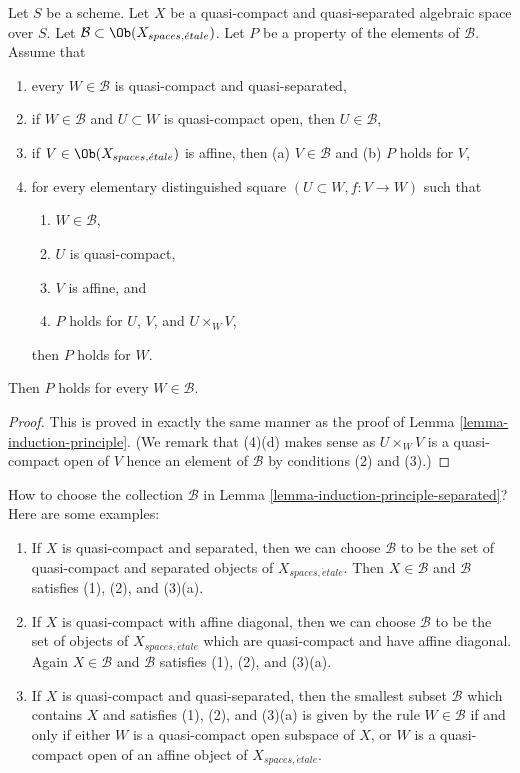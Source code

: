 \begin{lemma}
\label{lemma-induction-principle-separated}
Let $S$ be a scheme. Let $X$ be a quasi-compact and quasi-separated
algebraic space over $S$. Let
$\mathcal{B} \subset \Ob(X_{spaces, \acute{e}tale})$.
Let $P$ be a property of the elements of $\mathcal{B}$.
Assume that
\begin{enumerate}
\item every $W \in \mathcal{B}$ is quasi-compact and quasi-separated,
\item if $W \in \mathcal{B}$ and $U \subset W$ is quasi-compact open, then
$U \in \mathcal{B}$,
\item if $V \in \Ob(X_{spaces, \acute{e}tale})$ is affine, then
(a) $V \in \mathcal{B}$ and (b) $P$ holds for $V$,
\item for every elementary distinguished square $(U \subset W, f : V \to W)$
such that
\begin{enumerate}
\item $W \in \mathcal{B}$,
\item $U$ is quasi-compact,
\item $V$ is affine, and
\item $P$ holds for $U$, $V$, and $U \times_W V$,
\end{enumerate}
then $P$ holds for $W$.
\end{enumerate}
Then $P$ holds for every $W \in \mathcal{B}$.
\end{lemma}

\begin{proof}
This is proved in exactly the same manner as the proof of
Lemma \ref{lemma-induction-principle}.
(We remark that (4)(d) makes sense as $U \times_W V$ is a quasi-compact
open of $V$ hence an element of $\mathcal{B}$ by conditions
(2) and (3).)
\end{proof}

\begin{remark}
\label{remark-how-to}
How to choose the collection $\mathcal{B}$ in
Lemma \ref{lemma-induction-principle-separated}?
Here are some examples:
\begin{enumerate}
\item If $X$ is quasi-compact and separated, then we can choose
$\mathcal{B}$ to be the set of quasi-compact and separated objects
of $X_{spaces, \acute{e}tale}$. Then $X \in \mathcal{B}$ and $\mathcal{B}$
satisfies (1), (2), and (3)(a).
\item If $X$ is quasi-compact with affine diagonal, then we can choose
$\mathcal{B}$ to be the set of objects
of $X_{spaces, \acute{e}tale}$ which are quasi-compact and have affine
diagonal. Again $X \in \mathcal{B}$ and $\mathcal{B}$
satisfies (1), (2), and (3)(a).
\item If $X$ is quasi-compact and quasi-separated, then the
smallest subset $\mathcal{B}$ which contains $X$ and satisfies
(1), (2), and (3)(a) is given by the rule $W \in \mathcal{B}$ if and only
if either $W$ is a quasi-compact open subspace of $X$, or
$W$ is a quasi-compact open of an affine object of $X_{spaces, \acute{e}tale}$.
\end{enumerate}
\end{remark}




